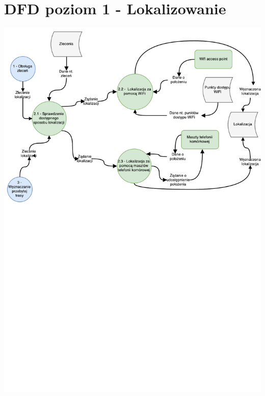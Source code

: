 \documentclass[11pt]{article}
\begin{document}
	\section{DFD poziom 1 - Lokalizowanie}
	\begin{center}
		\includegraphics[scale=0.8]{DFD2.pdf}
	\end{center}
	\newpage
\end{document}
